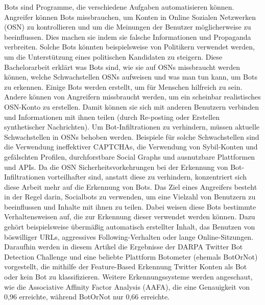Bots sind Programme, die verschiedene Aufgaben automatisieren können. Angreifer können Bots missbrauchen, um Konten in Online Sozialen Netzwerken (OSN) zu kontrollieren und um die Meinungen der Benutzer möglicherweise zu beeinflussen. Dies machen sie indem sie falsche Informationen und Propaganda verbreiten. Solche Bots könnten beispielsweise von Politikern verwendet werden, um die Unterstützung eines politischen Kandidaten zu steigern.
Diese Bachelorarbeit erklärt was Bots sind, wie sie auf OSNs missbraucht werden können, welche Schwachstellen OSNs aufweisen und was man tun kann, um Bots zu erkennen. Einige Bots werden erstellt, um für Menschen hilfreich zu sein. Andere können von Angreifern missbraucht werden, um ein scheinbar realistisches OSN-Konto zu erstellen. Damit können sie sich mit anderen Benutzern verbinden und Informationen mit ihnen teilen (durch Re-posting oder Erstellen synthetischer Nachrichten). Um Bot-Infiltrationen zu verhindern, müssen aktuelle Schwachstellen in OSNs behoben werden. Beispiele für solche Schwachstellen sind die Verwendung ineffektiver CAPTCHAs, die Verwendung von Sybil-Konten und gefälschten Profilen, durchforstbare Social Graphs und ausnutzbare Plattformen und APIs. Da die OSN Sicherheitsvorkehrungen bei der Erkennung von Bot-Infiltrationen vorteilhafter sind, anstatt diese zu verhindern, konzentriert sich diese Arbeit mehr auf die Erkennung von Bots.
Das Ziel eines Angreifers besteht in der Regel darin, Socialbots zu verwenden, um eine Vielzahl von Benutzern zu beeinflussen und Inhalte mit ihnen zu teilen. Dabei weisen diese Bots bestimmte Verhaltensweisen auf, die zur Erkennung dieser verwendet werden können. Dazu gehört beispielsweise übermäßig automatisch erstellter Inhalt, das Benutzen von böswilliger URLs, aggressives Following-Verhalten oder lange Online-Sitzungen. Daraufhin werden in diesem Artikel die Ergebnisse der \glqq DARPA Twitter Bot Detection Challenge\grqq{} und eine beliebte Plattform \glqq Botometer\grqq{}{} (ehemals \glqq BotOrNot\grqq{}) vorgestellt, die mithilfe der Feature-Based Erkennung Twitter Konten als Bot oder kein Bot zu klassifizieren. Weitere Erkennungssysteme werden angeschaut, wie die \glqq Associative Affinity Factor Analysis\grqq{} (AAFA), die eine Genauigkeit von 0,96 erreichte, während BotOrNot nur 0,66 erreichte.
